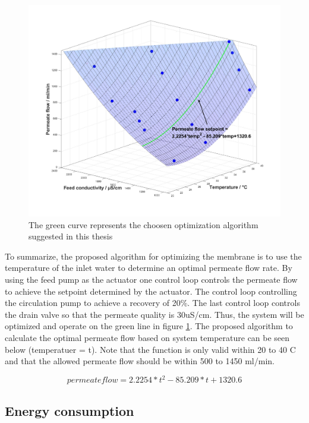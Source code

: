 \begin{figure}[H]
    \centering
    \includegraphics[width=1\textwidth]{FinalResult_4}
    \caption{The green curve represents the choosen optimization algorithm suggested in this thesis}
    \label{fig:FinalResult_4}
\end{figure}

To summarize, the proposed algorithm for optimizing the membrane is to use the temperature of the inlet water to determine an optimal permeate flow rate. By using the feed pump as the actuator one control loop controls the permeate flow to achieve the setpoint determined by the actuator. The control loop controlling the circulation pump to achieve a recovery of 20\%. The last control loop controls the drain valve so that the permeate quality is 30uS/cm. Thus, the system will be optimized and operate on the green line in figure \ref{fig:FinalResult_4}. The proposed algorithm to calculate the optimal permeate flow based on system temperature can be seen below (temperatuer = t). Note that the function is only valid within 20 to 40 C and that the allowed permeate flow should be within 500 to 1450 ml/min. 

\begin{equation}
permeate flow =  2.2254*t^2-85.209*t+1320.6
\end{equation}

\newpage

\subsection{Energy consumption}

